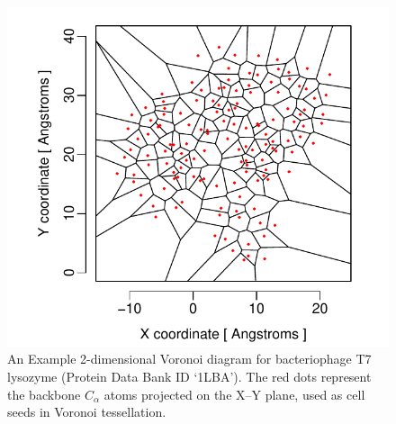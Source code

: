 \documentclass[11pt]{article}
\begin{document}
    \begin{figure}
        \begin{center}
        \includegraphics[width=6in]{voronoi_diagram.pdf}
        \end{center}
        \caption{An Example 2-dimensional Voronoi diagram for bacteriophage T7 lysozyme (Protein Data Bank ID `1LBA'). The red dots represent the backbone $C_\alpha$ atoms projected on the X--Y plane, used as cell seeds in Voronoi tessellation.}
        \label{fig:voronoi}
    \end{figure}
\end{document}
